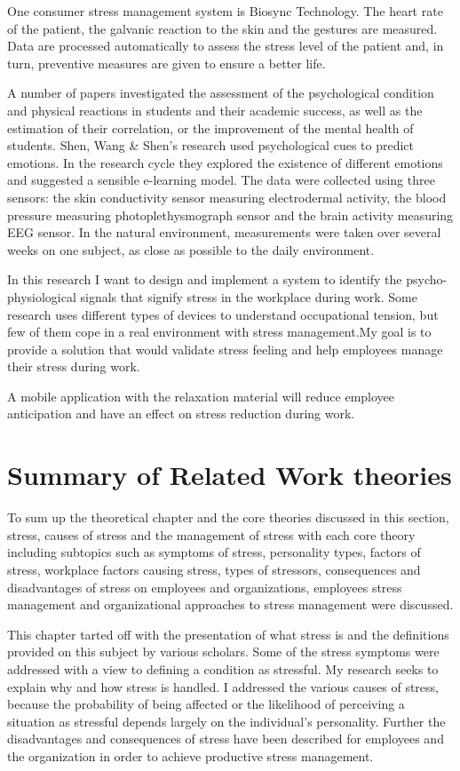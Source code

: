 One consumer stress management system is Biosync Technology. The heart rate of the patient, the galvanic reaction to the skin and the gestures are measured. Data are processed automatically to assess the stress level of the patient and, in turn, preventive measures are given to ensure a better life\citep{Nishida2017BioSync:Experience}.

A number of papers investigated the assessment of the psychological condition and physical reactions in students\citep{Santos-Gago2019InnovativeReview} and their academic success, as well as the estimation of their correlation, or the improvement of the mental health of students. Shen, Wang \& Shen's research \citep{article} used psychological cues to predict emotions.  In the research cycle they explored the existence of different emotions and suggested a sensible e-learning model. The data were collected using three sensors: the skin conductivity sensor measuring electrodermal activity, the blood pressure measuring photoplethysmograph sensor and the brain activity measuring EEG sensor. In the natural environment, measurements were taken over several weeks on one subject, as close as possible to the daily environment.

In this research I want to design and implement a system to identify the psycho-physiological signals that signify stress in the workplace during work. Some research uses different types of devices to understand occupational tension, but few of them cope in a real environment with stress management.My goal is to provide a solution that would validate stress feeling and help employees manage their stress during work.

A mobile application with the relaxation material will reduce employee anticipation and have an effect on stress reduction during work.
\section{Summary of Related Work theories}
To sum up the theoretical chapter and the core theories discussed in this section, stress, causes of stress and the management of stress with each core theory including subtopics such as symptoms of stress, personality types, factors of stress, workplace factors causing stress, types of stressors, consequences and disadvantages of stress on employees and organizations, employees stress management and organizational approaches to stress management were discussed.

This chapter tarted off with the presentation of what stress is and the definitions provided on this subject by various scholars.  Some of the stress symptoms were addressed with a view to defining a condition as stressful. My research seeks to explain why and how stress is handled. I addressed the various causes of stress, because the probability of being affected or the likelihood of perceiving a situation as stressful depends largely on the individual's personality. Further the disadvantages and consequences of stress have been described for employees and the organization in order to achieve productive stress management.

